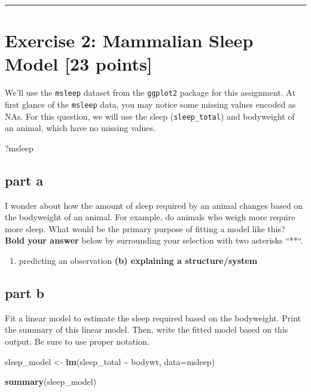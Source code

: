 \documentclass[
]{article}
\newenvironment{Shaded}{\begin{snugshade}}{\end{snugshade}}
\newcommand{\AttributeTok}[1]{\textcolor[rgb]{0.13,0.29,0.53}{#1}}
\newcommand{\FunctionTok}[1]{\textcolor[rgb]{0.13,0.29,0.53}{\textbf{#1}}}
\newcommand{\NormalTok}[1]{#1}
\newcommand{\OtherTok}[1]{\textcolor[rgb]{0.56,0.35,0.01}{#1}}
\newcommand{\SpecialCharTok}[1]{\textcolor[rgb]{0.81,0.36,0.00}{\textbf{#1}}}
\providecommand{\tightlist}{%
  \setlength{\itemsep}{0pt}\setlength{\parskip}{0pt}}
\begin{document}
\begin{center}\rule{0.5\linewidth}{0.5pt}\end{center}

\section{Exercise 2: Mammalian Sleep Model {[}23
points{]}}\label{exercise-2-mammalian-sleep-model-23-points}

We'll use the \texttt{msleep} dataset from the \texttt{ggplot2} package
for this assignment. At first glance of the \texttt{msleep} data, you
may notice some missing values encoded as NAs. For this question, we
will use the sleep (\texttt{sleep\_total}) and bodyweight of an animal,
which have no missing values.

\begin{Shaded}
\begin{Highlighting}[]
\NormalTok{?msleep}
\end{Highlighting}
\end{Shaded}

\subsection{part a}\label{part-a}

I wonder about how the amount of sleep required by an animal changes
based on the bodyweight of an animal. For example, do animals who weigh
more require more sleep. What would be the primary purpose of fitting a
model like this? \textbf{Bold your answer} below by surrounding your
selection with two asterisks ``**``.

\begin{enumerate}
\def\labelenumi{(\alph{enumi})}
\tightlist
\item
  predicting an observation \textbf{(b) explaining a structure/system}
\end{enumerate}

\subsection{part b}\label{part-b}

Fit a linear model to estimate the sleep required based on the
bodyweight. Print the summary of this linear model. Then, write the
fitted model based on this output. Be sure to use proper notation.

\begin{Shaded}
\begin{Highlighting}[]
\NormalTok{sleep\_model }\OtherTok{\textless{}{-}} \FunctionTok{lm}\NormalTok{(sleep\_total }\SpecialCharTok{\textasciitilde{}}\NormalTok{ bodywt, }\AttributeTok{data=}\NormalTok{msleep)}

\FunctionTok{summary}\NormalTok{(sleep\_model)}
\end{Highlighting}
\end{Shaded}
\end{document}
